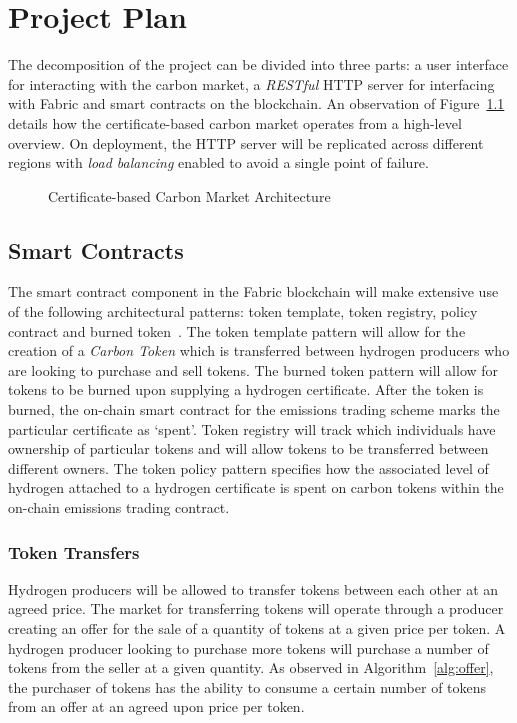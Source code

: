 \chapter{Project Plan}\label{ch:plan}
The decomposition of the project can be
divided into three parts:
a user interface for interacting with the
carbon market, a \textit{RESTful} HTTP server for
interfacing with Fabric and smart contracts on the
blockchain. An observation of Figure~\ref{fig:arch} details
how the certificate-based carbon market operates from a
high-level overview. On deployment, the HTTP server will be replicated
across different regions with \textit{load balancing} enabled to avoid
a single point of failure.

\begin{figure}[ht]
    \centering
    \begin{adjustbox}{max totalsize={2.1\textwidth}{1\textheight},center}
        
    \end{adjustbox}
    \caption{Certificate-based Carbon Market Architecture}
    \label{fig:arch}
\end{figure}

\section{Smart Contracts}
The smart contract component in the Fabric blockchain will
make extensive use of the following architectural
patterns: token template, token registry, policy contract
and burned token~\cite{patterns}. The token template pattern
will allow for the creation of a \textit{Carbon Token} which
is transferred between hydrogen producers who are looking
to purchase and sell tokens. The burned token pattern will
allow for tokens to be burned upon supplying a hydrogen
certificate. After the token is burned, the on-chain
smart contract for the emissions trading scheme marks
the particular certificate as `spent'. Token
registry will track which individuals have ownership of
particular tokens and will allow tokens to be transferred
between different owners. The token policy pattern
specifies how the associated level of hydrogen attached to
a hydrogen certificate is spent on carbon tokens within
the on-chain emissions trading contract.

\subsection{Token Transfers}
Hydrogen producers will be allowed to transfer tokens
between each other at an agreed price. The market
for transferring tokens will operate through a producer
creating an offer for the sale of a quantity of tokens
at a given price per token. A hydrogen producer looking
to purchase more tokens will purchase a number of tokens from
the seller at a given quantity. As observed in
Algorithm~\ref{alg:offer}, the purchaser of tokens
has the ability to consume a certain number of tokens from
an offer at an agreed upon price per token.

